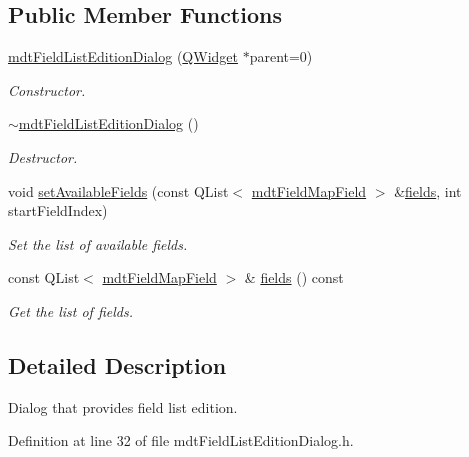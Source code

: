 \subsection*{Public Member Functions}
\begin{DoxyCompactItemize}
\item 
\hyperlink{classmdt_field_list_edition_dialog_a02c3cefeff70eedb41ff5caa2a52d5e4}{mdt\-Field\-List\-Edition\-Dialog} (\hyperlink{class_q_widget}{Q\-Widget} $\ast$parent=0)
\begin{DoxyCompactList}\small\item\em Constructor. \end{DoxyCompactList}\item 
\hyperlink{classmdt_field_list_edition_dialog_a39b7995b9ea9d7343ae09b2272b39b26}{$\sim$mdt\-Field\-List\-Edition\-Dialog} ()
\begin{DoxyCompactList}\small\item\em Destructor. \end{DoxyCompactList}\item 
void \hyperlink{classmdt_field_list_edition_dialog_a9eea066d1862f978c00e038471a95fff}{set\-Available\-Fields} (const Q\-List$<$ \hyperlink{classmdt_field_map_field}{mdt\-Field\-Map\-Field} $>$ \&\hyperlink{classmdt_field_list_edition_dialog_a10de0f00e5639bd3f2442f25423557ec}{fields}, int start\-Field\-Index)
\begin{DoxyCompactList}\small\item\em Set the list of available fields. \end{DoxyCompactList}\item 
const Q\-List$<$ \hyperlink{classmdt_field_map_field}{mdt\-Field\-Map\-Field} $>$ \& \hyperlink{classmdt_field_list_edition_dialog_a10de0f00e5639bd3f2442f25423557ec}{fields} () const 
\begin{DoxyCompactList}\small\item\em Get the list of fields. \end{DoxyCompactList}\end{DoxyCompactItemize}


\subsection{Detailed Description}
Dialog that provides field list edition. 

Definition at line 32 of file mdt\-Field\-List\-Edition\-Dialog.\-h.



